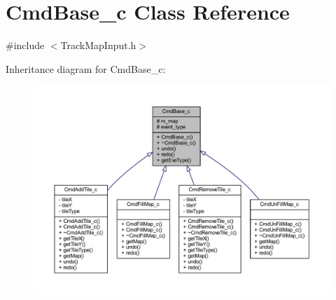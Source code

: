 \hypertarget{class_cmd_base__c}{\section{Cmd\+Base\+\_\+c Class Reference}
\label{class_cmd_base__c}
}


{\ttfamily \#include $<$Track\+Map\+Input.\+h$>$}



Inheritance diagram for Cmd\+Base\+\_\+c\+:
\nopagebreak
\begin{figure}[H]
\begin{center}
\leavevmode
\includegraphics[width=350pt]{class_cmd_base__c__inherit__graph}
\end{center}
\end{figure}


